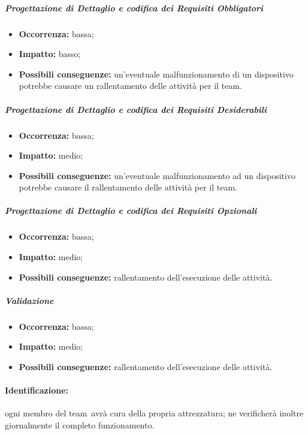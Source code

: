 \documentclass[../PianoProgetto.tex]{subfiles}
\begin{document}
		\subparagraph*{Progettazione di Dettaglio e codifica dei Requisiti Obbligatori}
			\begin{itemize}[label={-}]
				\item \textbf{Occorrenza:} bassa;
				\item \textbf{Impatto:} basso;
				\item \textbf{Possibili conseguenze:} un'eventuale malfunzionamento di un dispositivo potrebbe causare un rallentamento delle attività per il team.
			\end{itemize}
			
		\subparagraph*{Progettazione di Dettaglio e codifica dei Requisiti Desiderabili}
			\begin{itemize}[label={-}]
				\item \textbf{Occorrenza:} bassa;
				\item \textbf{Impatto:} medio;
				\item \textbf{Possibili conseguenze:} un'eventuale malfunzionamento ad un dispositivo potrebbe causare il rallentamento delle attività per il team.
			\end{itemize}
			
		\subparagraph*{Progettazione di Dettaglio e codifica dei Requisiti Opzionali}
			\begin{itemize}[label={-}]
				\item \textbf{Occorrenza:} bassa;
				\item \textbf{Impatto:} medio;
				\item \textbf{Possibili conseguenze:} rallentamento dell'esecuzione delle attività.
			\end{itemize}
			
		\subparagraph*{Validazione}
			\begin{itemize}[label={-}]
				\item \textbf{Occorrenza:} bassa;
				\item \textbf{Impatto:} medio;
				\item \textbf{Possibili conseguenze:} rallentamento dell'esecuzione delle attività.
			\end{itemize}
		
	\paragraph*{Identificazione:} ogni membro del team\g\ avrà cura della propria attrezzatura; ne verificherà inoltre giornalmente il completo funzionamento.
	
\end{document}
